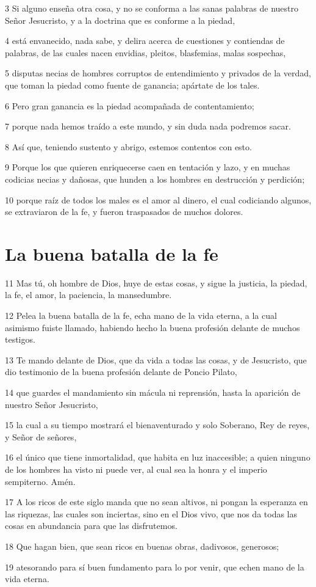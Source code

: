 \par 3 Si alguno enseña otra cosa, y no se conforma a las sanas palabras de nuestro Señor Jesucristo, y a la doctrina que es conforme a la piedad,
\par 4 está envanecido, nada sabe, y delira acerca de cuestiones y contiendas de palabras, de las cuales nacen envidias, pleitos, blasfemias, malas sospechas,
\par 5 disputas necias de hombres corruptos de entendimiento y privados de la verdad, que toman la piedad como fuente de ganancia; apártate de los tales.
\par 6 Pero gran ganancia es la piedad acompañada de contentamiento;
\par 7 porque nada hemos traído a este mundo, y sin duda nada podremos sacar.
\par 8 Así que, teniendo sustento y abrigo, estemos contentos con esto.
\par 9 Porque los que quieren enriquecerse caen en tentación y lazo, y en muchas codicias necias y dañosas, que hunden a los hombres en destrucción y perdición;
\par 10 porque raíz de todos los males es el amor al dinero, el cual codiciando algunos, se extraviaron de la fe, y fueron traspasados de muchos dolores.

\section*{La buena batalla de la fe}

\par 11 Mas tú, oh hombre de Dios, huye de estas cosas, y sigue la justicia, la piedad, la fe, el amor, la paciencia, la mansedumbre.
\par 12 Pelea la buena batalla de la fe, echa mano de la vida eterna, a la cual asimismo fuiste llamado, habiendo hecho la buena profesión delante de muchos testigos.
\par 13 Te mando delante de Dios, que da vida a todas las cosas, y de Jesucristo, que dio testimonio de la buena profesión delante de Poncio Pilato,
\par 14 que guardes el mandamiento sin mácula ni reprensión, hasta la aparición de nuestro Señor Jesucristo,
\par 15 la cual a su tiempo mostrará el bienaventurado y solo Soberano, Rey de reyes, y Señor de señores,
\par 16 el único que tiene inmortalidad, que habita en luz inaccesible; a quien ninguno de los hombres ha visto ni puede ver, al cual sea la honra y el imperio sempiterno. Amén.
\par 17 A los ricos de este siglo manda que no sean altivos, ni pongan la esperanza en las riquezas, las cuales son inciertas, sino en el Dios vivo, que nos da todas las cosas en abundancia para que las disfrutemos.
\par 18 Que hagan bien, que sean ricos en buenas obras, dadivosos, generosos;
\par 19 atesorando para sí buen fundamento para lo por venir, que echen mano de la vida eterna.

